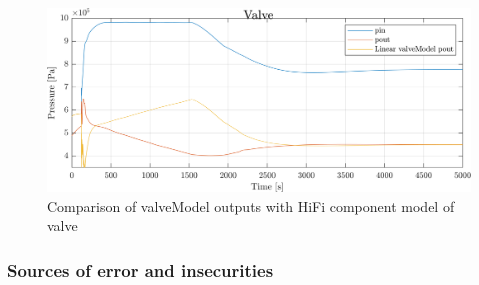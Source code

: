 \begin{figure}[h]
	\centering
	\includegraphics[width=1\textwidth]{Graphics/comp_test_val.png}
	\caption{Comparison of valveModel outputs with HiFi component model of valve}
	\label{fig:component_test_val}
\end{figure}

\clearpage

%
%
%
%
%
%
\subsubsection*{Sources of error and insecurities}
